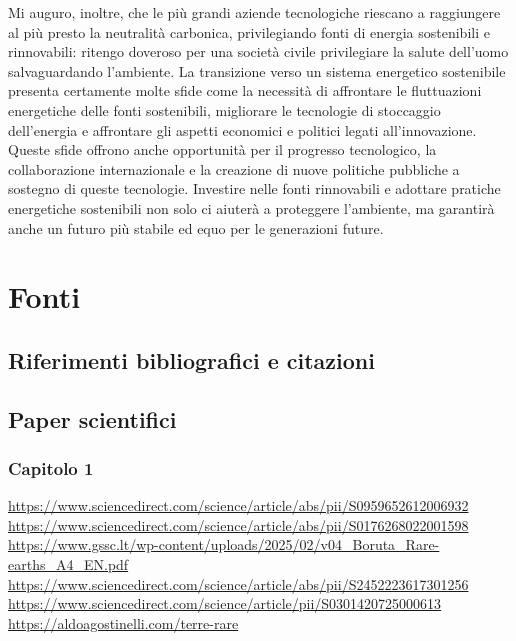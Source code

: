 \documentclass[12pt,a4paper,oneside]{book}
\begin{document}
Mi auguro, inoltre, che le più grandi aziende tecnologiche riescano a raggiungere al più presto la neutralità carbonica, privilegiando fonti di energia sostenibili e rinnovabili: ritengo doveroso per una società civile privilegiare la salute dell'uomo salvaguardando l'ambiente. La transizione verso un sistema energetico sostenibile presenta certamente molte sfide come la necessità di affrontare le fluttuazioni energetiche delle fonti sostenibili, migliorare le tecnologie di stoccaggio dell'energia e affrontare gli aspetti economici e politici legati all'innovazione.
Queste sfide offrono anche opportunità per il progresso tecnologico, la collaborazione internazionale e la creazione di nuove politiche pubbliche a sostegno di queste tecnologie. Investire nelle fonti rinnovabili e adottare pratiche energetiche sostenibili non solo ci aiuterà a proteggere l'ambiente, ma garantirà anche un futuro più stabile ed equo per le generazioni future.

\newpage

\chapter*{Fonti}
\renewcommand{\bibsection}{}
\section*{Riferimenti bibliografici e citazioni}
\nocite{*}


\section*{Paper scientifici}
\subsection*{Capitolo 1}
\sloppy

\url{https://www.sciencedirect.com/science/article/abs/pii/S0959652612006932} \\
\url{https://www.sciencedirect.com/science/article/abs/pii/S0176268022001598} \\
\url{https://www.gssc.lt/wp-content/uploads/2025/02/v04_Boruta_Rare-earths_A4_EN.pdf} \\
\url{https://www.sciencedirect.com/science/article/abs/pii/S2452223617301256} \\
\url{https://www.sciencedirect.com/science/article/pii/S0301420725000613}\\
\url{https://aldoagostinelli.com/terre-rare}
\end{document}
